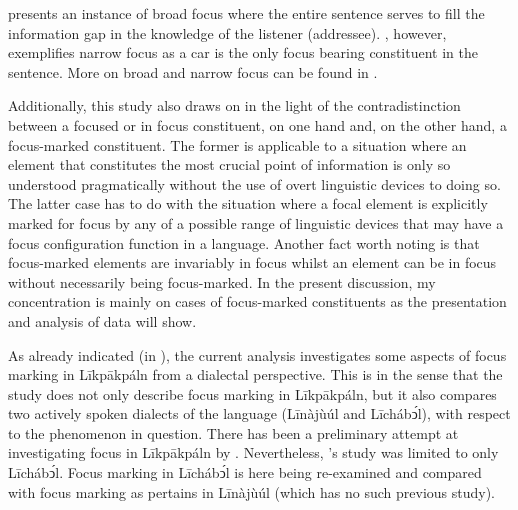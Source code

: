 \documentclass[output=paper,colorlinks,citecolor=brown]{langscibook}
\begin{document}
 presents an instance of broad focus where the entire sentence serves to fill the information gap in the knowledge of the listener (addressee). , however, exemplifies narrow focus as a car is the only focus bearing constituent in the sentence. More on broad and narrow focus can be found in \citet[96--97]{Hyman2010}.

Additionally, this study also draws on \citet[93]{VanPutten2016} in the light of the contradistinction between a focused or in focus constituent, on one hand and, on the other hand, a focus-marked constituent. The former is applicable to a situation where an element that constitutes the most crucial point of information is only so understood pragmatically without the use of overt linguistic devices to doing so. The latter case has to do with the situation where a focal element is explicitly marked for focus by any of a possible range of linguistic devices that may have a focus configuration function in a language. Another fact worth noting is that focus-marked elements are invariably in focus whilst an element can be in focus without necessarily being focus-marked. In the present discussion, my concentration is mainly on cases of focus-marked constituents as the presentation and analysis of data will show.

As already indicated (in ), the current analysis investigates some aspects of focus marking in Līkpākpáln from a dialectal perspective. This is in the sense that the study does not only describe focus marking in Līkpākpáln, but it also compares two actively spoken dialects of the language (Līnàjùúl and Līchábͻ́l), with respect to the phenomenon in question. There has been a preliminary attempt at investigating focus in Līkpākpáln by \citet{Schwarz2009}. Nevertheless, \citeauthor{Schwarz2009}’s study was limited to only Līchábͻ́l. Focus marking in Līchábͻ́l is here being re-examined and compared with focus marking as pertains in Līnàjùúl (which has no such previous study).
\end{document}

